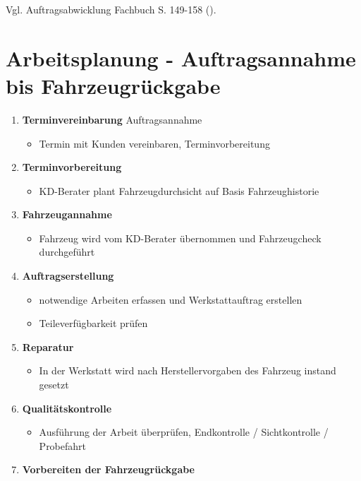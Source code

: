 Vgl. Auftragsabwicklung Fachbuch S. 149-158
(\textcite{heiser:2017:betriebsfuhrung}).

\newpage

\section{Arbeitsplanung - Auftragsannahme bis
Fahrzeugrückgabe}\label{arbeitsplanung-auftragsannahme-bis-fahrzeugrueckgabe}

\begin{enumerate}
\item
  \textbf{Terminvereinbarung} Auftragsannahme

  \begin{itemize}
  \item
    Termin mit Kunden vereinbaren, Terminvorbereitung
  \end{itemize}
\item
  \textbf{Terminvorbereitung}

  \begin{itemize}
  \item
    KD-Berater plant Fahrzeugdurchsicht auf Basis Fahrzeughistorie
  \end{itemize}
\item
  \textbf{Fahrzeugannahme}

  \begin{itemize}
  \item
    Fahrzeug wird vom KD-Berater übernommen und Fahrzeugcheck
    durchgeführt
  \end{itemize}
\item
  \textbf{Auftragserstellung}

  \begin{itemize}
  \item
    notwendige Arbeiten erfassen und Werkstattauftrag erstellen
  \item
    Teileverfügbarkeit prüfen
  \end{itemize}
\item
  \textbf{Reparatur}

  \begin{itemize}
  \item
    In der Werkstatt wird nach Herstellervorgaben des Fahrzeug instand
    gesetzt
  \end{itemize}
\item
  \textbf{Qualitätskontrolle}

  \begin{itemize}
  \item
    Ausführung der Arbeit überprüfen, Endkontrolle / Sichtkontrolle /
    Probefahrt
  \end{itemize}
\item
  \textbf{Vorbereiten der Fahrzeugrückgabe}


\end{enumerate}
